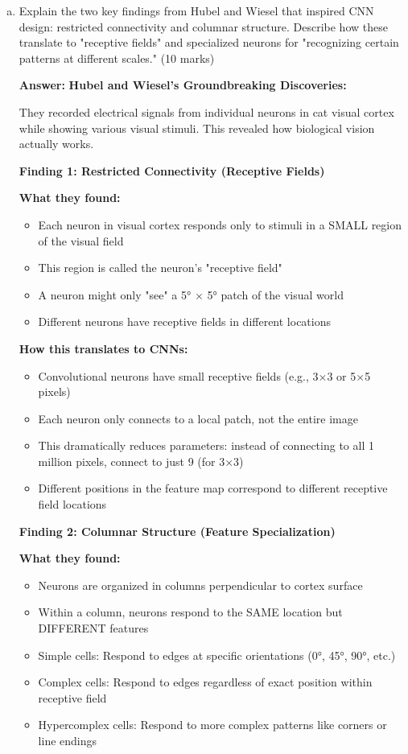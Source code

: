 \documentclass[12pt]{article}
\newcommand{\answer}[1]{{\color{answercolor}\textbf{Answer:} #1}}
\newcommand{\explanation}[1]{{\color{explanationcolor}#1}}
\begin{document}
\begin{enumerate}[(a)]
    \item Explain the two key findings from Hubel and Wiesel that inspired CNN design: restricted connectivity and columnar structure. Describe how these translate to "receptive fields" and specialized neurons for "recognizing certain patterns at different scales." \hfill (10 marks)
    
    \answer{
    \textbf{Hubel and Wiesel's Groundbreaking Discoveries:}
    
    \explanation{
    They recorded electrical signals from individual neurons in cat visual cortex while showing various visual stimuli. This revealed how biological vision actually works.
    }
    
    \textbf{Finding 1: Restricted Connectivity (Receptive Fields)}
    
    \explanation{
    \textbf{What they found:}
    \begin{itemize}
        \item Each neuron in visual cortex responds only to stimuli in a SMALL region of the visual field
        \item This region is called the neuron's "receptive field"
        \item A neuron might only "see" a 5° × 5° patch of the visual world
        \item Different neurons have receptive fields in different locations
    \end{itemize}
    
    \textbf{How this translates to CNNs:}
    \begin{itemize}
        \item Convolutional neurons have small receptive fields (e.g., 3×3 or 5×5 pixels)
        \item Each neuron only connects to a local patch, not the entire image
        \item This dramatically reduces parameters: instead of connecting to all 1 million pixels, connect to just 9 (for 3×3)
        \item Different positions in the feature map correspond to different receptive field locations
    \end{itemize}
    }
    
    \textbf{Finding 2: Columnar Structure (Feature Specialization)}
    
    \explanation{
    \textbf{What they found:}
    \begin{itemize}
        \item Neurons are organized in columns perpendicular to cortex surface
        \item Within a column, neurons respond to the SAME location but DIFFERENT features
        \item Simple cells: Respond to edges at specific orientations (0°, 45°, 90°, etc.)
        \item Complex cells: Respond to edges regardless of exact position within receptive field
        \item Hypercomplex cells: Respond to more complex patterns like corners or line endings
    \end{itemize}
    
}}
\end{enumerate}
\end{document}

